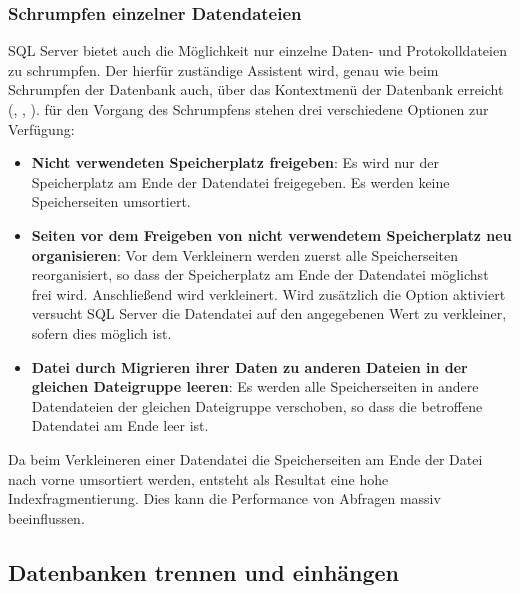         \subsubsection{Schrumpfen einzelner Datendateien}
          SQL Server bietet auch die Möglichkeit nur einzelne Daten- und
          Protokolldateien zu schrumpfen. Der hierf\"ur zuständige Assistent wird,
          genau wie beim Schrumpfen der Datenbank auch, über das Kontextmenü der Datenbank
          erreicht (, ,
          ).
          f\"ur den Vorgang des Schrumpfens stehen drei verschiedene Optionen zur
          Verfügung:
          \begin{itemize}
              \item \textbf{Nicht verwendeten Speicherplatz freigeben}: Es wird
              nur der Speicherplatz am Ende der Datendatei freigegeben. Es
              werden keine Speicherseiten umsortiert.
              \item \textbf{Seiten vor dem Freigeben von nicht verwendetem
              Speicherplatz neu organisieren}: Vor dem Verkleinern werden zuerst
              alle Speicherseiten reorganisiert, so dass der Speicherplatz am
              Ende der Datendatei möglichst frei wird. Anschließend wird
              verkleinert. Wird zusätzlich die Option  aktiviert versucht SQL Server die Datendatei auf
              den angegebenen Wert zu verkleiner, sofern dies möglich ist.
              \item \textbf{Datei durch Migrieren ihrer Daten zu anderen Dateien
              in der gleichen Dateigruppe leeren}: Es werden alle Speicherseiten
              in andere Datendateien der gleichen Dateigruppe verschoben, so
              dass die betroffene Datendatei am Ende leer ist.
          \end{itemize}
          \begin{merke}
            Da beim Verkleineren einer Datendatei die Speicherseiten am Ende der
            Datei nach vorne umsortiert werden, entsteht als Resultat eine hohe
            Indexfragmentierung. Dies kann die Performance von Abfragen massiv
            beeinflussen.
          \end{merke}
      \subsection{Datenbanken trennen und einhängen}
      \label{movedatabases}
